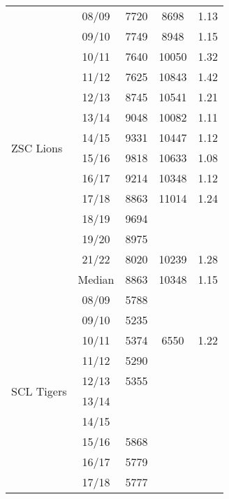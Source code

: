 \begin{longtable}[c]{p{5cm}cccc}
    
    \multirow[t]{14}{=}{ZSC Lions}    & 08/09 & 7720 & 8698 & 1.13 \\ 
                                     & 09/10 & 7749 & 8948 & 1.15 \\ 
                                     & 10/11 & 7640 & 10050 & 1.32 \\ 
                                     & 11/12 & 7625 & 10843 & 1.42 \\ 
                                     & 12/13 & 8745 & 10541 & 1.21 \\ 
                                     & 13/14 & 9048 & 10082 & 1.11 \\ 
                                     & 14/15 & 9331 & 10447 & 1.12 \\ 
                                     & 15/16 & 9818 & 10633 & 1.08 \\ 
                                     & 16/17 & 9214 & 10348 & 1.12 \\ 
                                     & 17/18 & 8863 & 11014 & 1.24 \\ 
                                     & 18/19 & 9694 & ~ & ~ \\ 
                                     & 19/20 & 8975 & ~ & ~ \\ 
                                     & 21/22 & 8020 & 10239 & 1.28 \\ 
                                     \cmidrule{2-5}
                                     & Median & 8863 & 10348 & 1.15 \\ 
                                     \cmidrule{1-5}
    \multirow[t]{14}{=}{SCL Tigers}   & 08/09 & 5788 & ~ & ~ \\ 
                                     & 09/10 & 5235 & ~ & ~ \\ 
                                     & 10/11 & 5374 & 6550 & 1.22 \\ 
                                     & 11/12 & 5290 & ~ & ~ \\ 
                                     & 12/13 & 5355 & ~ & ~ \\ 
                                     & 13/14 & ~ & ~ & ~ \\ 
                                     & 14/15 & ~ & ~ & ~ \\ 
                                     & 15/16 & 5868 & ~ & ~ \\ 
                                     & 16/17 & 5779 & ~ & ~ \\ 
                                     & 17/18 & 5777 & ~ & ~ \\ 

\end{longtable}
